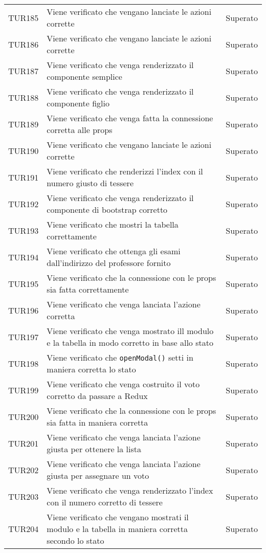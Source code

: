 \documentclass[PianoDiQualifica.tex]{subfiles}
\begin{document}
\begin{longtable}[H]{P{2cm}P{8.5cm}P{3cm}}
	TUR185 & Viene verificato che vengano lanciate le azioni corrette & Superato \\
	TUR186 & Viene verificato che vengano lanciate le azioni corrette & Superato \\
	TUR187 & Viene verificato che venga renderizzato il componente semplice & Superato \\
	TUR188 & Viene verificato che venga renderizzato il componente figlio & Superato \\
	TUR189 & Viene verificato che venga fatta la connessione corretta alle props & Superato \\
	TUR190 & Viene verificato che vengano lanciate le azioni corrette & Superato \\
	TUR191 & Viene verificato che renderizzi l'index con il numero giusto di tessere & Superato \\
	TUR192 & Viene verificato che venga renderizzato il componente di bootstrap corretto & Superato \\
	TUR193 & Viene verificato che mostri la tabella correttamente & Superato \\
	TUR194 & Viene verificato che ottenga gli esami dall'indirizzo del professore fornito & Superato \\
	TUR195 & Viene verificato che la connessione con le props sia fatta correttamente & Superato \\
	TUR196 & Viene verificato che venga lanciata l'azione corretta & Superato \\
	TUR197 & Viene verificato che venga mostrato ill modulo e la tabella in modo corretto in base allo stato & Superato \\
	TUR198 & Viene verificato che \texttt{openModal()} setti in maniera corretta lo stato & Superato \\
	TUR199 & Viene verificato che venga costruito il voto corretto da passare a Redux & Superato \\
	TUR200 & Viene verificato che la connessione con le props sia fatta in maniera corretta & Superato \\
	TUR201 & Viene verificato che venga lanciata l'azione giusta per ottenere la lista & Superato \\
	TUR202 & Viene verificato che venga lanciata l'azione giusta per assegnare un voto & Superato \\
	TUR203 & Viene verificato che venga renderizzato l'index con il numero corretto di tessere & Superato \\
	TUR204 & Viene verificato che vengano mostrati il modulo e la tabella in maniera corretta secondo lo stato & Superato \\

\end{longtable}
\end{document}
